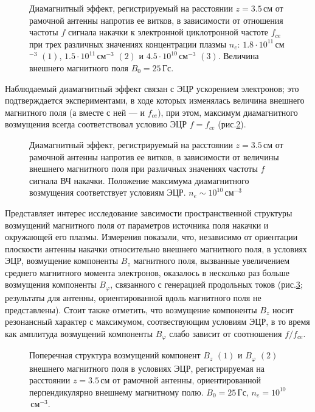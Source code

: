 \documentclass[autoref,10pt]{disser}
\begin{document}
\begin{figure}[H]
    \centering
    \def\svgwidth{0.6\columnwidth} %
    
    \caption{Диамагнитный эффект, регистрируемый на расстоянии $z=3.5$\,см от рамочной антенны напротив ее витков, в зависимости от отношения частоты $f$ сигнала накачки к электронной циклотронной частоте $f_{ce}$ при трех различных значениях концентрации плазмы $n_{e}$: $1.8\cdot{}10^{11}$\,см$^{-3}$ $(1)$, $1.5\cdot{}10^{11}$\,см$^{-3}$ $(2)$ и $4.5\cdot{}10^{10}$\,см$^{-3}$ $(3)$. Величина внешнего магнитного поля $B_{0}=25$\,Гс.}
    \label{fig:cyclotrone_lines}
\end{figure}

Наблюдаемый диамагнитный эффект связан с ЭЦР ускорением электронов; это подтверждается экспериментами, в ходе которых изменялась величина внешнего магнитного поля (а вместе с ней --- и $f_{ce}$), при этом,  максимум диамагнитного возмущения всегда соответствовал условию ЭЦР $f=f_{ce}$ (\mbox{рис.\ref{fig:ecr_combine}}).
\begin{figure}[H]
    \centering
    \def\svgwidth{0.6\columnwidth} %
    
    \caption{Диамагнитный эффект, регистрируемый на расстоянии $z=3.5$\,см от рамочной антенны напротив ее витков, в зависимости от величины внешнего магнитного поля при различных значениях частоты $f$ сигнала ВЧ накачки. Положение максимума диамагнитного возмущения соответствует условиям ЭЦР.  $n_{e}\sim{}10^{10}$\,см$^{-3}$}
    \label{fig:ecr_combine}
\end{figure}

Представляет интерес исследование завсимости пространственной структуры возмущений магнитного поля от параметров источника поля накачки и окружающей его плазмы.
Измерения показали, что, независимо от ориентации плоскости антенны накачки относительно внешнего магнитного поля, в условиях ЭЦР, возмущение компоненты $B_{z}$ магнитного поля, вызванные увеличением среднего магнитного момента электронов,  оказалось в несколько раз больше возмущения компоненты $B_{\varphi}$, связанного с генерацией продольных токов (\mbox{рис.\ref{fig:transverse}}; результаты для антенны, ориентированной вдоль магнитного поля не представлены).  Стоит также отметить, что возмущение компоненты $B_{z}$ носит резонансный характер с максимумом, соотвествующим условиям ЭЦР, в то время как амплитуда возмущений компоненты $B_{\varphi}$ слабо зависит от соотношения $f/f_{ce}$.
\begin{figure}[H]
    \centering
    \def\svgwidth{0.6\columnwidth} %
    
    \caption{Поперечная структура возмущений компонент $B_{z}$ $(1)$ и $B_{\varphi}$ $(2)$ внешнего магнитного поля в условиях ЭЦР, регистрируемая на расстоянии $z=3.5$\,см от рамочной антенны, ориентированной перпендикулярно внешнему магнитному полю. $B_{0}=25$\,Гс, $n_{e}=10^{10}$\,см$^{-3}$.}
    \label{fig:transverse}
\end{figure}
\end{document}
